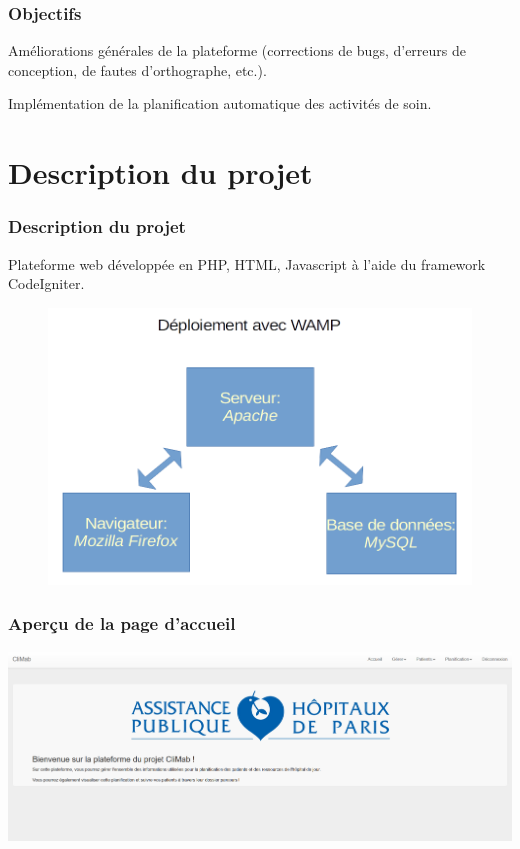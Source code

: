 \documentclass{beamer}
\begin{document}
\begin{frame}
\frametitle{Objectifs}

Améliorations générales de la plateforme (corrections de bugs, d'erreurs de conception, de fautes d'orthographe, etc.).

\bigbreak

Implémentation de la planification automatique des activités de soin.

\end{frame}


\section[Description]{Description du projet}

\begin{frame}
\frametitle{Description du projet}

Plateforme web développée en PHP, HTML, Javascript à l'aide du framework CodeIgniter.


\begin{figure}
	\includegraphics[scale=0.5]{images/deploiement_wamp}
\end{figure}

\end{frame}

\begin{frame}
\frametitle{Aperçu de la page d'accueil}

\begin{center}
	\includegraphics[scale=0.28]{images/accueil}
\end{center}

\end{frame}
\end{document}
